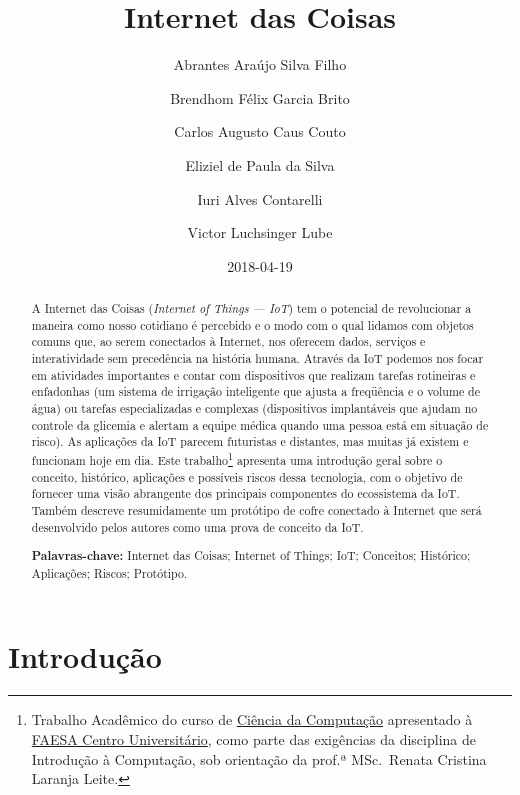 \documentclass[pdftex, brazil, 12pt, twoside]{article}
\newcommand{\ingles}[1]{\textit{#1}}
\begin{document}
\title{Internet das Coisas}
\author{Abrantes Araújo Silva Filho \and Brendhom Félix Garcia Brito
  \and Carlos Augusto Caus Couto \and Eliziel de Paula da Silva \and Iuri Alves Contarelli
  \and Victor Luchsinger Lube}
\date{2018-04-19}
\maketitle
\begin{abstract}
  A Internet das Coisas (\ingles{Internet of Things --- IoT}) tem o potencial de
  revolucionar a maneira como nosso cotidiano é percebido e o modo com o qual lidamos
  com objetos comuns que, ao serem conectados à Internet, nos oferecem dados, serviços
  e interatividade sem precedência na história humana. Através da IoT podemos nos
  focar em atividades importantes e contar com dispositivos que realizam tarefas
  rotineiras e enfadonhas (um sistema de irrigação inteligente que ajusta a
  freqüência e o volume de água) ou tarefas especializadas e complexas (dispositivos
  implantáveis que ajudam no controle da glicemia e alertam a equipe médica
  quando uma pessoa está em situação de risco). As aplicações da IoT parecem futuristas
  e distantes, mas muitas já existem e funcionam hoje em dia.
  Este trabalho\footnote{%
  Trabalho Acadêmico do curso de
  \href{https://www.faesa.br/curso/ciencia-da-computacao/}{Ciência da Computação}
  apresentado à \href{https://www.faesa.br/}{FAESA Centro Universitário}, como
  parte das exigências
  da disciplina de Introdução à Computação, sob orientação da prof.ª MSc.\ Renata
  Cristina Laranja Leite.} apresenta
  uma introdução geral sobre o conceito, histórico, aplicações e possíveis riscos
  dessa tecnologia, com o objetivo de fornecer uma visão abrangente dos principais
  componentes do ecossistema da IoT. Também descreve resumidamente um protótipo
  de cofre conectado à Internet que será desenvolvido pelos autores como uma prova
  de conceito da IoT.

  \textbf{Palavras-chave:} Internet das Coisas; Internet of Things;
  IoT; Conceitos; Histórico; Aplicações; Riscos; Protótipo.
\end{abstract}
\tableofcontents


\section{Introdução}
\label{intro}
\end{document}
